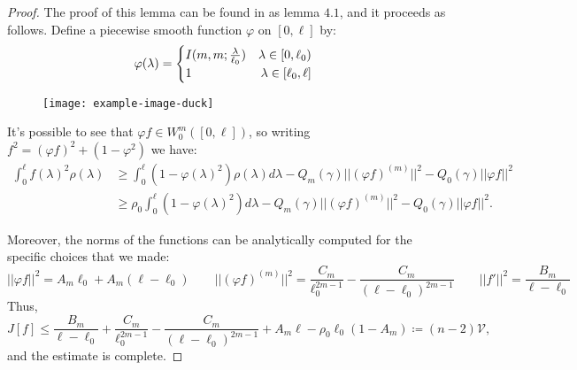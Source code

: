 \begin{proof}
	The proof of this lemma can be found in \cite{fewster2020new} as lemma \(4.1\), and it proceeds as follows. Define a piecewise smooth function \(\varphi\) on \([0,\ell]\) by:
	\[
	\varphi(\lambda) = 
	\begin{cases}
		I(m, m;\frac{\lambda}{\ell_0}) \quad \hfill \lambda \in [0, \ell_0) \\
		1 \hfill \lambda \in [\ell_0, \ell]
	\end{cases}	
	\]

	\begin{figure}
		\centering
		\texttt{[image: example-image-duck]}
	\end{figure}
	
	It's possible to see that \(\varphi f \in W_0^m([0,\ell])\), so writing \(f^2 = (\varphi f)^2 + (1 - \varphi^2)\) we have:
	\begin{align*}
		\int_0^{\ell} f(\lambda)^2\rho(\lambda) &\ge \int_0^{\ell} (1 - \varphi(\lambda)^2)\rho(\lambda)d\lambda - Q_m(\gamma) \vert\vert (\varphi f)^{(m)}\vert\vert^2 - Q_0(\gamma) \vert\vert \varphi f\vert\vert^2 \\
		&\ge  \rho_0\int_0^{\ell} (1 - \varphi(\lambda)^2)d\lambda - Q_m(\gamma) \vert\vert (\varphi f)^{(m)}\vert\vert^2 - Q_0(\gamma) \vert\vert \varphi f\vert\vert^2.
	\end{align*}

	Moreover, the norms of the functions can be analytically computed for the specific choices that we made:
	\[
		\vert\vert \varphi f\vert\vert^2 = A_m\ell_0 + A_m(\ell - \ell_0)\quad\quad
		\vert\vert (\varphi f)^{(m)}\vert\vert^2 = \frac{C_m}{\ell_0^{2m - 1}} - \frac{C_m}{(\ell - \ell_0)^{2m - 1}}
		\quad\quad 
		\vert\vert f'\vert\vert^2 = \frac{B_m}{\ell - \ell_0}
	\]
	Thus,
	\[
		J[f] \le \frac{B_m}{\ell - \ell_0} + \frac{C_m}{\ell_0^{2m - 1}} - \frac{C_m}{(\ell - \ell_0)^{2m - 1}} + A_m\ell - \rho_0\ell_0(1 - A_m) \coloneqq (n-2)\mathcal{V},
	\]
	and the estimate is complete.
\end{proof}

